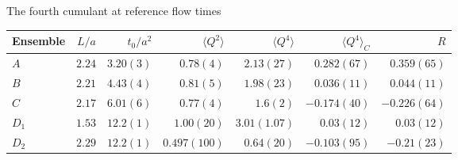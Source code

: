 \documentclass[10pt,show notes on second screen]{beamer}
\begin{document}
\begin{frame}{The fourth cumulant at reference flow times}
\begin{table}
    \centering
    \begin{tabular}{l r r r r r r}
        \toprule
        Ensemble & $L/a$ & $t_0/a^2$ & $\langle Q^2 \rangle$ & $\langle Q^4 \rangle$ & $\langle Q^4 \rangle_C$ & $R$             \\
        \midrule
        $A$      & $2.24$ & $3.20(3)$ & $0.78(4)$             & $2.13(27)$            & $0.282(67)$             & $0.359(65)$     \\ 
        $B$      & $2.21$ & $4.43(4)$ & $0.81(5)$             & $1.98(23)$            & $0.036(11)$             & $0.044(11)$     \\ 
        $C$      & $2.17$ & $6.01(6)$ & $0.77(4)$             & $1.6(2)$              & $-0.174(40)$            & $-0.226(64)$    \\ 
        $D_1$    & $1.53$ & $12.2(1)$ & $1.00(20)$            & $3.01(1.07)$          & $0.03(12)$              & $0.03(12)$      \\ 
        $D_2$    & $2.29$ & $12.2(1)$ & $0.497(100)$          & $0.64(20)$            & $-0.103(95)$            & $-0.21(23)$     \\ 
        \bottomrule
    \end{tabular}
\end{table}
\end{frame}
\end{document}
